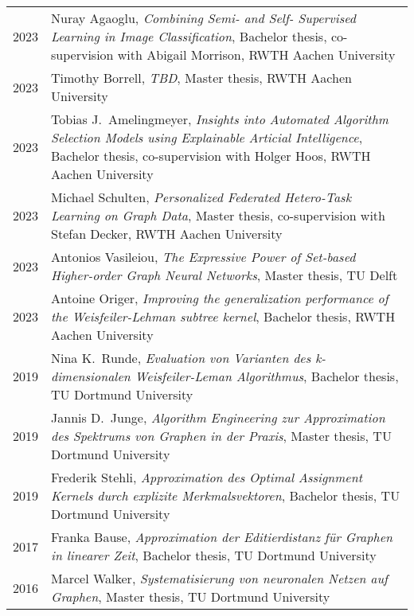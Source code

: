 \documentclass[10pt, a4paper, DIV=12, headings=small]{scrartcl}
\begin{document}
\begin{longtabu}{p{2.1cm}p{12.0cm}}
	2023 & Nuray Agaoglu, \emph{Combining Semi- and Self- Supervised Learning in Image Classification}, Bachelor thesis, co-supervision with Abigail Morrison, RWTH Aachen University\\    
	2023 & Timothy Borrell, \emph{TBD}, Master thesis, RWTH Aachen University\\
	2023 & Tobias J.\ Amelingmeyer, \emph{Insights into Automated Algorithm Selection Models using Explainable Articial Intelligence}, Bachelor thesis, co-supervision with Holger Hoos, RWTH Aachen University \\
	2023 & Michael Schulten, \emph{Personalized Federated Hetero-Task Learning on Graph Data}, Master thesis, co-supervision with Stefan Decker, RWTH Aachen University                                         \\
	2023 & Antonios Vasileiou, \emph{The Expressive Power of Set-based Higher-order Graph Neural Networks}, Master thesis, TU Delft                                                                             \\
	2023 & Antoine Origer, \emph{Improving the generalization performance of the Weisfeiler-Lehman subtree kernel}, Bachelor thesis, RWTH Aachen University                                                     \\
	2019 & Nina K.\ Runde, \emph{Evaluation von Varianten des k-dimensionalen Weisfeiler-Leman Algorithmus}, Bachelor thesis, TU Dortmund University                                                            \\
	2019 & Jannis D.\ Junge, \emph{Algorithm Engineering zur Approximation des Spektrums von Graphen in der Praxis}, Master thesis, TU Dortmund University                                                      \\
	2019 & Frederik Stehli, \emph{Approximation des Optimal Assignment Kernels durch explizite Merkmalsvektoren}, Bachelor thesis, TU Dortmund University                                                       \\
	2017 & Franka Bause, \emph{Approximation der Editierdistanz für Graphen in linearer Zeit}, Bachelor thesis, TU Dortmund University                                                                          \\
	2016 & Marcel Walker, \emph{Systematisierung von neuronalen Netzen auf Graphen}, Master thesis, TU Dortmund University                                                                                      \\

\end{longtabu}
\end{document}
